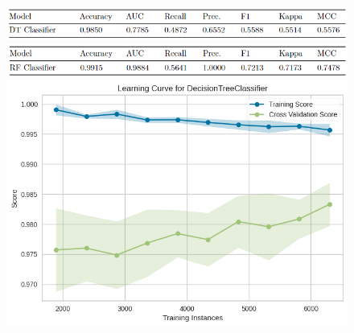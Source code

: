 \documentclass[
  oneclumn]{article}
\begin{document}
\begin{figure}

\begin{minipage}{0.50\linewidth}

\includegraphics{dt_table.png}

\end{minipage}%
%
\begin{minipage}{0.50\linewidth}

\includegraphics{rf_table.png}

\end{minipage}%
\newline
\begin{minipage}{0.50\linewidth}

\includegraphics{dt_learn.png}

\end{minipage}%
%
\begin{minipage}{0.50\linewidth}


\end{minipage}
\end{figure}
\end{document}

